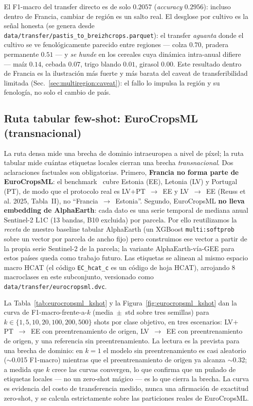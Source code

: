 El F1-macro del transfer directo es de solo $0.2057$ (\emph{accuracy} $0.2956$): incluso
dentro de Francia, cambiar de región es un salto real. El desglose por cultivo es la señal
honesta (se genera desde \texttt{data/transfer/pastis\_to\_breizhcrops.parquet}): el transfer
\emph{aguanta} donde el cultivo se ve fenológicamente parecido entre regiones --- colza
$0.70$, pradera permanente $0.51$ --- y \emph{se hunde} en los cereales cuya dinámica
intra-anual difiere --- maíz $0.14$, cebada $0.07$, trigo blando $0.01$, girasol $0.00$.
Este resultado dentro de Francia es la ilustración más fuerte y más barata del caveat de
transferibilidad limitada (Sec.~\ref{sec:multiregion:caveat}): el fallo lo impulsa la región
y su fenología, no solo el cambio de país.

\subsection{Ruta tabular few-shot: EuroCropsML (transnacional)}
\label{sec:multiregion:fewshot}

La ruta densa mide una brecha de dominio intraeuropea a nivel de píxel;
la ruta tabular mide cuántas etiquetas locales cierran una brecha
\emph{transnacional}. Dos aclaraciones factuales son obligatorias.
Primero, \textbf{Francia no forma parte de EuroCropsML}: el
benchmark~\cite{reuss2025eurocropsml} cubre Estonia (EE), Letonia (LV) y
Portugal (PT), de modo que el protocolo real es
LV$+$PT~$\rightarrow$~EE y LV~$\rightarrow$~EE (Reuss et al.
2025, Tabla~II), no ``Francia~$\rightarrow$~Estonia''.
Segundo, EuroCropsML \textbf{no lleva embedding de AlphaEarth}: cada dato
es una serie temporal de mediana anual Sentinel-2 L1C (13 bandas, B10
excluida) por parcela. Por ello reutilizamos la \emph{receta} de nuestro
baseline tabular AlphaEarth (un XGBoost \texttt{multi:softprob} sobre un
vector por parcela de ancho fijo) pero construimos ese vector a partir de
la propia serie Sentinel-2 de la parcela; la variante
AlphaEarth-vía-GEE para estos países queda como trabajo futuro. Las
etiquetas se alinean al mismo espacio macro HCAT (el código
\texttt{EC\_hcat\_c} es un código de hoja HCAT), arrojando 8 macroclases
en este subconjunto, versionado como
\texttt{data/transfer/eurocropsml.dvc}.

La Tabla~\ref{tab:eurocropsml_kshot} y la
Figura~\ref{fig:eurocropsml_kshot} dan la curva de F1-macro-frente-a-$k$
(media~$\pm$~std sobre tres semillas) para $k \in
\{1,5,10,20,100,200,500\}$ shots por clase objetivo, en tres escenarios:
LV$+$PT~$\rightarrow$~EE con preentrenamiento de origen,
LV~$\rightarrow$~EE con preentrenamiento de origen, y una referencia sin
preentrenamiento. La lectura es la prevista para una brecha de dominio:
en $k{=}1$ el modelo sin preentrenamiento es casi aleatorio
($\sim$0.015 F1-macro) mientras que el preentrenamiento de origen ya
alcanza $\sim$0.32; a medida que $k$ crece las curvas convergen, lo que
confirma que un puñado de etiquetas locales --- no un zero-shot mágico
--- es lo que cierra la brecha. La curva es evidencia del costo de
transferencia medido, nunca una afirmación de exactitud zero-shot, y se
calcula estrictamente sobre las particiones reales de EuroCropsML.


